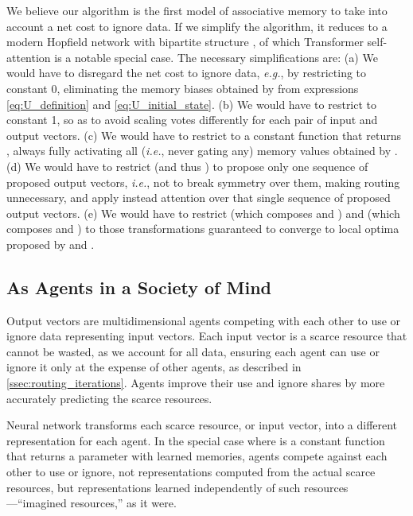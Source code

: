 \documentclass[11pt,a4paper]{article}
\begin{document}
We believe our algorithm is the first model of associative memory to take into account a net cost to ignore data. If we simplify the algorithm, it reduces to a modern Hopfield network with bipartite structure \cite{krotov2021large} \cite{ramsauer2021hopfield}, of which Transformer self-attention \cite{DBLP:journals/corr/VaswaniSPUJGKP17} is a notable special case. The necessary simplifications are: (a) We would have to disregard the net cost to ignore data, {\em e.g.}, by restricting  to constant 0, eliminating the memory biases obtained by  from expressions \eqref{eq:U_definition} and \eqref{eq:U_initial_state}. (b) We would have to restrict  to constant 1, so as to avoid scaling votes differently for each pair of input and output vectors. (c) We would have to restrict  to a constant function that returns , always fully activating all ({\em i.e.}, never gating any) memory values obtained by . (d) We would have to restrict  (and thus ) to propose only one sequence of proposed output vectors, {\em i.e.}, not to break symmetry over them, making routing unnecessary, and apply instead attention over that single sequence of proposed output vectors. (e) We would have to restrict  (which composes  and ) and  (which composes  and ) to those transformations guaranteed to converge to local optima proposed by \citet{krotov2021large} and \citet{ramsauer2021hopfield}.


\subsection{As Agents in a Society of Mind}

Output vectors are multidimensional agents competing with each other to use or ignore data representing input vectors. Each input vector is a scarce resource that cannot be wasted, as we account for all data, ensuring each agent can use or ignore it only at the expense of other agents, as described in \ref{ssec:routing_iterations}. Agents improve their use and ignore shares by more accurately predicting the scarce resources.

Neural network  transforms each scarce resource, or input vector, into a different representation for each agent. In the special case where  is a constant function that returns a parameter  with learned memories, agents compete against each other to use or ignore, not representations computed from the actual scarce resources, but representations learned independently of such resources---``imagined resources,'' as it were.
\end{document}
